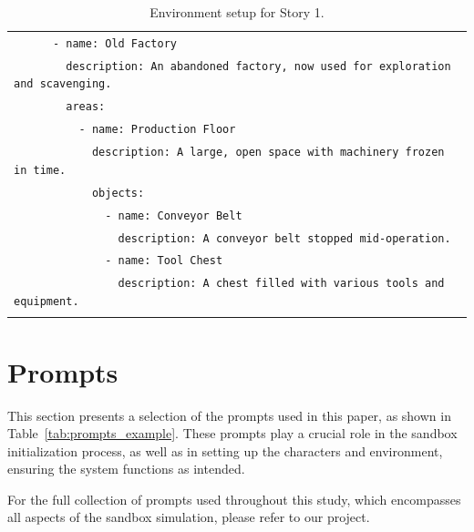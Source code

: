 \documentclass[letterpaper]{article} %
\begin{document}
\begin{small}
\begin{longtable}{p{\textwidth}}
    \texttt{\ \ \ \ \ \ - name: Old Factory} \\
    \texttt{\ \ \ \ \ \ \ \ description: An abandoned factory, now used for exploration and scavenging.} \\
    \texttt{\ \ \ \ \ \ \ \ areas:} \\
    \texttt{\ \ \ \ \ \ \ \ \ \ - name: Production Floor} \\
    \texttt{\ \ \ \ \ \ \ \ \ \ \ \ description: A large, open space with machinery frozen in time.} \\
    \texttt{\ \ \ \ \ \ \ \ \ \ \ \ objects:} \\
    \texttt{\ \ \ \ \ \ \ \ \ \ \ \ \ \ - name: Conveyor Belt} \\
    \texttt{\ \ \ \ \ \ \ \ \ \ \ \ \ \ \ \ description: A conveyor belt stopped mid-operation.} \\
    \texttt{\ \ \ \ \ \ \ \ \ \ \ \ \ \ - name: Tool Chest} \\
    \texttt{\ \ \ \ \ \ \ \ \ \ \ \ \ \ \ \ description: A chest filled with various tools and equipment.} \\
    
    \bottomrule

    \caption{Environment setup for Story 1.}
    \label{tab:story_1_environment_setup}
  \end{longtable}
\end{small}

\twocolumn

\section{Prompts}
\label{sec:prompts}

This section presents a selection of the prompts used in this paper, as shown in Table~\ref{tab:prompts_example}. These prompts play a crucial role in the sandbox initialization process, as well as in setting up the characters and environment, ensuring the system functions as intended.

For the full collection of prompts used throughout this study, which encompasses all aspects of the sandbox simulation, please refer to our project.

\onecolumn
\end{document}
